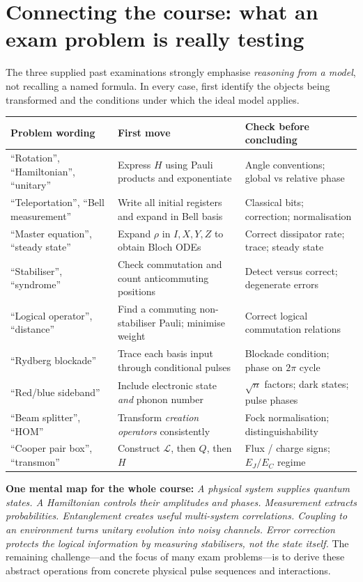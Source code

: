 \section{Connecting the course: what an exam problem is really testing}\label{sec:navigate}
The three supplied past examinations strongly emphasise \emph{reasoning from a model}, not recalling a named formula. In every case, first identify the objects being transformed and the conditions under which the ideal model applies.
\begin{center}
\small
\renewcommand{\arraystretch}{1.13}
\begin{tabularx}{\linewidth}{@{}p{37mm}Xp{41mm}@{}}\toprule
Problem wording&First move&Check before concluding\\\midrule
``Rotation'', ``Hamiltonian'', ``unitary''&Express $H$ using Pauli products and exponentiate&Angle conventions; global vs relative phase\\
``Teleportation'', ``Bell measurement''&Write all initial registers and expand in Bell basis&Classical bits; correction; normalisation\\
``Master equation'', ``steady state''&Expand $\rho$ in $I,X,Y,Z$ to obtain Bloch ODEs&Correct dissipator rate; trace; steady state\\
``Stabiliser'', ``syndrome''&Check commutation and count anticommuting positions&Detect versus correct; degenerate errors\\
``Logical operator'', ``distance''&Find a commuting non-stabiliser Pauli; minimise weight&Correct logical commutation relations\\
``Rydberg blockade''&Trace each basis input through conditional pulses&Blockade condition; phase on $2\pi$ cycle\\
``Red/blue sideband''&Include electronic state \emph{and} phonon number&$\sqrt n$ factors; dark states; pulse phases\\
``Beam splitter'', ``HOM''&Transform \emph{creation operators} consistently&Fock normalisation; distinguishability\\
``Cooper pair box'', ``transmon''&Construct $\mathcal L$, then $Q$, then $H$&Flux / charge signs; $E_J/E_C$ regime\\\bottomrule
\end{tabularx}
\end{center}

\begin{bigidea}
\textbf{One mental map for the whole course:} \emph{A physical system supplies quantum states. A Hamiltonian controls their amplitudes and phases. Measurement extracts probabilities. Entanglement creates useful multi-system correlations. Coupling to an environment turns unitary evolution into noisy channels. Error correction protects the logical information by measuring stabilisers, not the state itself.} The remaining challenge---and the focus of many exam problems---is to derive these abstract operations from concrete physical pulse sequences and interactions.
\end{bigidea}

